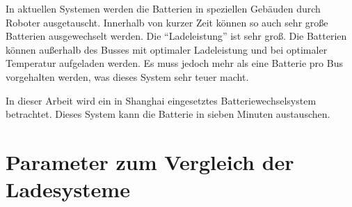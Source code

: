 In aktuellen Systemen werden die Batterien in speziellen Gebäuden durch Roboter ausgetauscht. Innerhalb von kurzer Zeit können so auch sehr große Batterien ausgewechselt werden. Die "`Ladeleistung"' ist sehr groß. Die Batterien können außerhalb des Busses mit optimaler Ladeleistung und bei optimaler Temperatur aufgeladen werden. Es muss jedoch mehr als eine Batterie pro Bus vorgehalten werden, was dieses System sehr teuer macht.

In dieser Arbeit wird ein in Shanghai eingesetztes Batteriewechselsystem betrachtet. Dieses System kann die Batterie in sieben Minuten austauschen.


\section{Parameter zum Vergleich der Ladesysteme}
\label{parameter}

